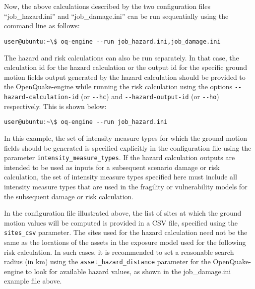 \inputminted[firstline=1,firstnumber=1,fontsize=\footnotesize,frame=single,linenos,bgcolor=lightgray,label=job\_hazard.ini]{ini}{oqum/risk/verbatim/config_scenario_hazard.ini}\\

\inputminted[firstline=1,firstnumber=1,fontsize=\footnotesize,frame=single,linenos,bgcolor=lightgray,label=job\_damage.ini]{ini}{oqum/risk/verbatim/config_scenario_damage.ini}\\

Now, the above calculations described by the two configuration files
``job\_hazard.ini'' and ``job\_damage.ini'' can be run sequentially using the
command line as follows:

\begin{verbatim}
user@ubuntu:~\$ oq-engine --run job_hazard.ini,job_damage.ini
\end{verbatim}

The hazard and risk calculations can also be run separately. In that case, the
calculation id for the hazard calculation or the output id for the specific
ground motion fields output generated by the hazard calculation should be
provided to the OpenQuake-engine while running the risk calculation using the
options \Verb+--hazard-calculation-id+ (or \Verb+--hc+) and 
\Verb+--hazard-output-id+ (or \Verb+--ho+) respectively. This is shown below:

\begin{verbatim}
user@ubuntu:~\$ oq-engine --run job_hazard.ini
\end{verbatim}

In this example, the set of intensity measure types for which the ground
motion fields should be generated is specified explicitly in the configuration
file using the parameter \Verb+intensity_measure_types+. If the hazard
calculation outputs are intended to be used as inputs for a subsequent
scenario damage or risk calculation, the set of intensity measure types
specified here must include all intensity measure types that are used in the
fragility or vulnerability models for the subsequent damage or risk
calculation.

In the configuration file illustrated above, the list of sites at which the
ground motion values will be computed is provided in a CSV file, specified
using the \Verb+sites_csv+ parameter. The sites used for the hazard
calculation need not be the same as the locations of the assets in the
exposure model used for the following risk calculation. In such cases, it is
recommended to set a reasonable search radius (in km) using the
\Verb+asset_hazard_distance+ parameter for the OpenQuake-engine to look for
available hazard values, as shown in the job\_damage.ini example file above.

